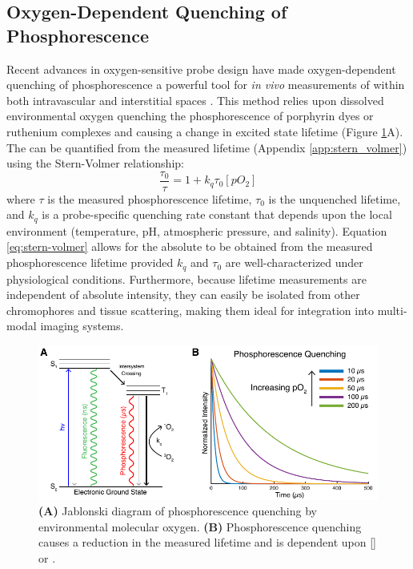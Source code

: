 \subsection{Oxygen-Dependent Quenching of Phosphorescence}
Recent advances in oxygen-sensitive probe design have made oxygen-dependent quenching of phosphorescence a powerful tool for \textit{in vivo} measurements of  within both intravascular and interstitial spaces \cite{Vinogradov:2012tda, Esipova:2011hi}. This method relies upon dissolved environmental oxygen quenching the phosphorescence of porphyrin dyes or ruthenium complexes and causing a change in excited state lifetime (Figure \ref{fig:jablonski}A).  The  can be quantified from the measured lifetime (Appendix \ref{app:stern_volmer}) using the Stern-Volmer relationship:
%
\begin{equation}
    \label{eq:stern-volmer}
    \frac{\tau_{0}}{\tau} = 1 + k_{q}\tau_{0}[pO_{2}]
\end{equation}
%
where $\tau$ is the measured phosphorescence lifetime, $\tau_{0}$ is the unquenched lifetime, and $k_{q}$ is a probe-specific quenching rate constant that depends upon the local environment (temperature, pH, atmospheric pressure, and salinity). Equation \ref{eq:stern-volmer} allows for the absolute  to be obtained from the measured phosphorescence lifetime provided $k_q$ and $\tau_{0}$ are well-characterized under physiological conditions. Furthermore, because lifetime measurements are independent of absolute intensity, they can easily be isolated from other chromophores and tissue scattering, making them ideal for integration into multi-modal imaging systems.

\begin{figure}
    \includegraphics{figures/chapter_1/jablonski.pdf}
    \caption{
        \label{fig:jablonski}
        \textbf{(A)} Jablonski diagram of phosphorescence quenching by environmental molecular oxygen. \textbf{(B)} Phosphorescence quenching causes a reduction in the measured lifetime and is dependent upon [] or .
    }
\end{figure}

